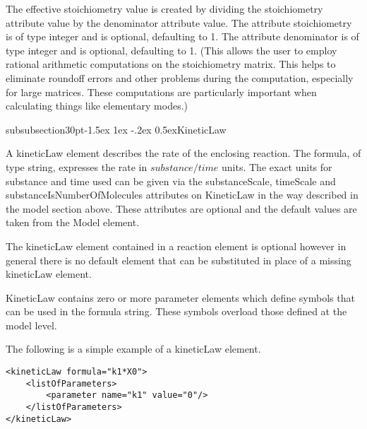 \documentclass[10pt]{article}
\makeatletter
\renewcommand{\subsubsection}{\@startsection%
  {subsubsection}{3}{0pt}{-1.5ex \@plus 1ex \@minus -.2ex}%
  {0.5ex}{\slshape\normalsize\bfseries}}
\newcommand{\tightspacing}{\renewcommand{\baselinestretch}{0.85}}
\newcommand{\regularspacing}{\renewcommand{\baselinestretch}{1.0}}
\newcommand{\class}[1]{\textsf{#1}}
\newcommand{\attrib}[1]{\textsf{#1}}
\makeatother
\begin{document}
The effective stoichiometry value is created by dividing the
\attrib{stoichiometry} attribute value by the
\attrib{denominator} attribute value. The attribute
\attrib{stoichiometry} is of type integer and is optional,
defaulting to 1. The attribute \attrib{denominator} is of type
integer and is optional, defaulting to 1. (This allows the user to
employ rational arithmetic computations on the stoichiometry
matrix. This helps to eliminate roundoff errors and other
problems during the computation, especially for large matrices.
These computations are particularly important when calculating
things like elementary modes.)

\subsubsection{KineticLaw}

A \class{kineticLaw} element describes the rate of the enclosing
reaction.  The \attrib{formula}, of type string, expresses the
rate in $substance / time$ units. The exact units for substance
and time used can be given via the \attrib{substanceScale},
\attrib{timeScale} and \attrib{substanceIsNumberOfMolecules}
attributes on KineticLaw in the way described in the \class{model}
section above.  These attributes are optional and the default
values are taken from the \class{Model} element.

The \class{kineticLaw} element contained in a \class{reaction}
element is optional however in general there is no default element
that can be substituted in place of a missing \class{kineticLaw}
element.

\class{KineticLaw} contains zero or more \class{parameter}
elements which define symbols that can be used in the formula
string.  These symbols overload those defined at the model level.

The following is a simple example of a \class{kineticLaw} element.
\begin{small}
\tightspacing
\begin{verbatim}
<kineticLaw formula="k1*X0">
    <listOfParameters>
        <parameter name="k1" value="0"/>
    </listOfParameters>
</kineticLaw>
\end{verbatim}
\regularspacing
\end{small}

\end{document}
